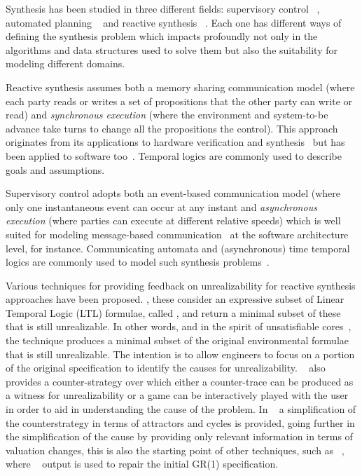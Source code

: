 Synthesis has been studied in three different fields: supervisory control 
~\cite{ramadge:1989}, automated planning ~\cite{fikes1971strips,penberthy1992ucpop} and reactive synthesis ~\cite{harel1985development,pnueli1985transition}.  Each one has different ways of defining the synthesis problem 
which impacts profoundly not only in the algorithms and data structures used to solve 
them but also the suitability for modeling different domains. 

Reactive synthesis assumes both a memory sharing communication model (where each party reads 
or writes a set of propositions that the other party can write or read) and 
\textit{synchronous execution} (where the environment and system-to-be advance 
take turns to change all the propositions the control). This approach 
originates from its applications to hardware verification and synthesis~\cite{DBLP:conf/popl/PnueliR89} but has 
been applied to software too~\cite{manna1980deductive}. Temporal logics 
are commonly used to describe goals and assumptions. 

Supervisory control adopts both an event-based communication model (where only one 
instantaneous event can occur at any instant  and \textit{asynchronous execution} (where parties can execute at 
different relative speeds) which is well suited for modeling message-based 
communication~\cite{DBLP:journals/cacm/Hoare78, Milner:1982} at the software architecture level, for instance. 
Communicating automata  and (asynchronous) time temporal logics are commonly used 
to model such synthesis problems~\cite{ramadge:1989}. 

Various techniques for providing feedback on unrealizability for reactive synthesis 
approaches have been proposed. \cite{DBLP:conf/fmcad/KonighoferHB09, 
DBLP:journals/scp/Schuppan12,DBLP:conf/fmcad/AlurMT13,maoz2021unrealizable},
these consider an expressive subset of Linear Temporal 
Logic (LTL) formulae, called \gr, and return a minimal subset of these that is still 
unrealizable. In other words, and in the spirit of unsatisfiable cores~\cite{Torlak:2008}, 
the technique produces a minimal subset of the original environmental formulae that is 
still unrealizable. The intention is to allow engineers to focus on a portion of the original 
specification to identify the causes for unrealizability. 
~\cite{DBLP:conf/fmcad/KonighoferHB09} also provides a counter-strategy over which 
either a counter-trace can be produced as a witness for unrealizability or a game can be 
interactively played with the user in order to aid in understanding the cause of the 
problem. In ~\cite{DBLP:conf/sigsoft/KuventMR17} a simplification of the 
counterstrategy in terms of attractors and cycles is provided, going further in the 
simplification of the cause by providing only relevant information in terms of valuation 
changes, this is also the starting point of other techniques, such as 
~\cite{maoz2019symbolic}, where ~\cite{DBLP:conf/sigsoft/KuventMR17} output is 
used to repair the initial GR(1) specification.

